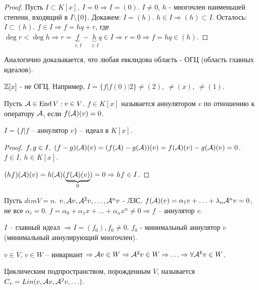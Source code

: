 \documentclass[main]{subfiles}
\begin{document}
\begin{proof}
    Пусть $I \subset K[x],\ I = 0 \Rightarrow I = (0)$. $I \neq 0 $, $h$ - многочлен наименьшей степени, входящий в $I\setminus \{0\}$.
    Докажем: $I = (h)$. $h \in I \Rightarrow (h) \subset I$.
    Осталось: $I \subset (h)$. $f \in I \Rightarrow f=hq+r$, где $\deg r < \deg h
        \Rightarrow r = \underbrace{f}_{\in I} - \underbrace{h}_{\in I} q \in I \Rightarrow r = 0 \Rightarrow f = hq \in (h)$.
\end{proof}

\begin{remark}
    Аналогично доказывается, что любая евклидова область - ОГЦ (область главных идеалов).
\end{remark}

\begin{remark}
    $\mathbb{Z}[x]$ - не ОГЦ. Например, $I = \{f|f(0) \vdots 2\} \neq (2),\ \neq (x),\ \neq (1)$.
\end{remark}

\begin{definition}
    Пусть $\mathcal{A} \in \operatorname{End} V : v\in V$. $f \in K[x]$ называется аннулятором $v$ по отношению к оператору $\mathcal{A}$, если $f(\mathcal{A})(v) = 0$.
\end{definition}

\begin{lemma}
    $I = \{f | f$ -- аннулятор $v \}$ -- идеал в $K[x]$.
\end{lemma}

\begin{proof}
    $f, g \in I,\ (f-g)(\mca)(v) = (f(\mca)-g(\mca))(v) = f(\mca)(v) - g(\mca)(v) = 0$.
    $f \in I,\ h \in K[x]$.

    $(hf)(\mathcal{A})(v) = h(\mathcal{A})(\underbrace{f(\mathcal{A})(v)}_{0}) = 0 \Rightarrow hf \in I$.
\end{proof}

Пусть $dim V = n$. $v, \mathcal{A} v, {\mathcal{A}}^2 v, \ldots, {\mathcal{A}}^n v$ - ЛЗС.
$f(\mathcal{A})(v) = \alpha_1v + \ldots + \lambda_n {\mathcal{A}}^n v = 0$, не все $\alpha_i =0$.
$f = \alpha_0 + \alpha_1 x + \ldots + \alpha_n x^n \neq 0 \Rightarrow f$ -- аннулятор $v$.

$I$ -- главный идеал $\Rightarrow I=(f_0), f_0 \neq 0$. $f_0$ - минимальный аннулятор $v$ (минимальный аннулирующий многочлен).

$v \in V$, $v\in W$ -- инвариант $\Rightarrow \mathcal{A} v \in W \Rightarrow {\mathcal{A}}^2 v \in W \Rightarrow \ldots \Rightarrow \forall {\mathcal{A}}^k v \in W$.

\begin{definition}
    Циклическим подпространством, порожденным $V$, называется $C_v = Lin(v, \mathcal{A} v, {\mathcal{A}}^2 v, \ldots)$.
\end{definition}
\end{document}
